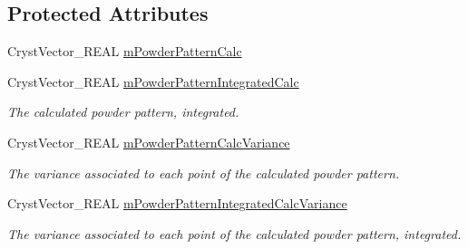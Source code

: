 \subsection*{Protected Attributes}
\begin{DoxyCompactItemize}
\item 
Cryst\+Vector\+\_\+\+R\+E\+AL \mbox{\hyperlink{class_obj_cryst_1_1_powder_pattern_component_ae6e41d0a85e00cdf0a7d52f74dc20d4a}{m\+Powder\+Pattern\+Calc}}
\item 
\mbox{\label{class_obj_cryst_1_1_powder_pattern_component_a86c152ac7f6fca46572986ea99686ae0}} 
Cryst\+Vector\+\_\+\+R\+E\+AL \mbox{\hyperlink{class_obj_cryst_1_1_powder_pattern_component_a86c152ac7f6fca46572986ea99686ae0}{m\+Powder\+Pattern\+Integrated\+Calc}}
\begin{DoxyCompactList}\small\item\em The calculated powder pattern, integrated. \end{DoxyCompactList}\item 
\mbox{\label{class_obj_cryst_1_1_powder_pattern_component_a01a50aa4e4114acc999676cd8069d426}} 
Cryst\+Vector\+\_\+\+R\+E\+AL \mbox{\hyperlink{class_obj_cryst_1_1_powder_pattern_component_a01a50aa4e4114acc999676cd8069d426}{m\+Powder\+Pattern\+Calc\+Variance}}
\begin{DoxyCompactList}\small\item\em The variance associated to each point of the calculated powder pattern. \end{DoxyCompactList}\item 
\mbox{\label{class_obj_cryst_1_1_powder_pattern_component_aeaeac00300d33fa5d9ebae323143c6e2}} 
Cryst\+Vector\+\_\+\+R\+E\+AL \mbox{\hyperlink{class_obj_cryst_1_1_powder_pattern_component_aeaeac00300d33fa5d9ebae323143c6e2}{m\+Powder\+Pattern\+Integrated\+Calc\+Variance}}
\begin{DoxyCompactList}\small\item\em The variance associated to each point of the calculated powder pattern, integrated. \end{DoxyCompactList}\item 
\mbox{\label{class_obj_cryst_1_1_powder_pattern_component_ad0441f62b3b16e18f7cbdda6d89432cb}} 

\end{DoxyCompactItemize}
